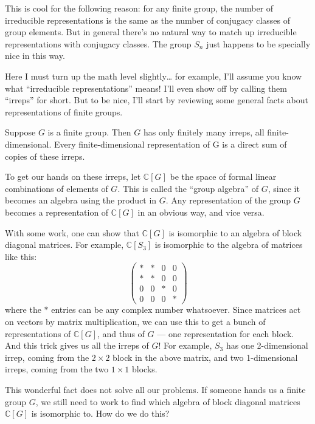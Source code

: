 \documentclass{article}
\begin{document}
This is cool for the following reason: for any finite group, the number
of irreducible representations is the same as the number of conjugacy
classes of group elements. But in general there's no natural way to
match up irreducible representations with conjugacy classes. The group
\(S_n\) just happens to be specially nice in this way.

Here I must turn up the math level slightly\ldots{} for example, I'll
assume you know what ``irreducible representations'' means! I'll even
show off by calling them ``irreps'' for short. But to be nice, I'll
start by reviewing some general facts about representations of finite
groups.

Suppose \(G\) is a finite group. Then \(G\) has only finitely many
irreps, all finite-dimensional. Every finite-dimensional representation
of G is a direct sum of copies of these irreps.

To get our hands on these irreps, let \(\mathbb{C}[G]\) be the space of
formal linear combinations of elements of \(G\). This is called the
``group algebra'' of \(G\), since it becomes an algebra using the
product in \(G\). Any representation of the group \(G\) becomes a
representation of \(\mathbb{C}[G]\) in an obvious way, and vice versa.

With some work, one can show that \(\mathbb{C}[G]\) is isomorphic to an
algebra of block diagonal matrices. For example, \(\mathbb{C}[S_3]\) is
isomorphic to the algebra of matrices like this: \[
  \left(
    \begin{array}{cccc}
      * & * & 0 & 0
    \\* & * & 0 & 0
    \\0 & 0 & * & 0
    \\0 & 0 & 0 & *
    \end{array}
  \right)
\] where the \(*\) entries can be any complex number whatsoever. Since
matrices act on vectors by matrix multiplication, we can use this to get
a bunch of representations of \(\mathbb{C}[G]\), and thus of \(G\) ---
one representation for each block. And this trick gives us all the
irreps of \(G\)! For example, \(S_3\) has one 2-dimensional irrep,
coming from the \(2\times 2\) block in the above matrix, and two
1-dimensional irreps, coming from the two \(1\times 1\) blocks.

This wonderful fact does not solve all our problems. If someone hands us
a finite group \(G\), we still need to work to find which algebra of
block diagonal matrices \(\mathbb{C}[G]\) is isomorphic to. How do we do
this?
\end{document}
